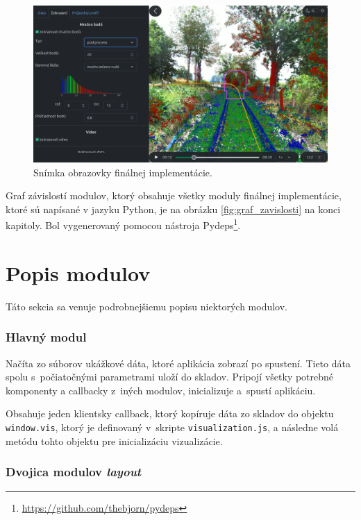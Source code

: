 \begin{figure}[h]
    \centering
    \includegraphics[width=1\linewidth]{text_prace/obrazky-figures/screenshot.png}
    \caption{Snímka obrazovky finálnej implementácie.}
    \label{fig:screenshot}
\end{figure}

Graf závislostí modulov, ktorý obsahuje všetky moduly finálnej implementácie, ktoré sú napísané v jazyku Python, je na obrázku \ref{fig:graf_zavislosti} na konci kapitoly. Bol vygenerovaný pomocou nástroja Pydeps\footnote{\url{https://github.com/thebjorn/pydeps}}.

\section{Popis modulov}

Táto sekcia sa venuje podrobnejšiemu popisu niektorých modulov.

\subsubsection{Hlavný modul }

Načíta zo súborov ukážkové dáta, ktoré aplikácia zobrazí po spustení. Tieto dáta spolu s~počiatočnými parametrami uloží do skladov. Pripojí všetky potrebné komponenty a callbacky z~iných modulov, inicializuje a~spustí aplikáciu.

Obsahuje jeden klientsky callback, ktorý kopíruje dáta zo skladov do objektu \texttt{window.vis}, ktorý je definovaný v~skripte \texttt{visualization.js}, a následne volá metódu tohto objektu pre inicializáciu vizualizácie.

\subsubsection{Dvojica modulov \emph{layout} }

